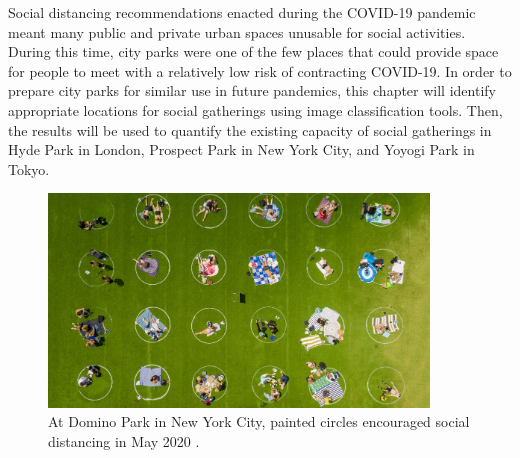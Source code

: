 \noindent Social distancing recommendations enacted during the COVID-19 pandemic meant many public and private urban spaces unusable for social activities. During this time, city parks were one of the few places that could provide space for people to meet with a relatively low risk of contracting COVID-19. In order to prepare city parks for similar use in future pandemics, this chapter will identify appropriate locations for social gatherings using image classification tools. Then, the results will be used to quantify the existing capacity of social gatherings in Hyde Park in London, Prospect Park in New York City, and Yoyogi Park in Tokyo.\\

\begin{figure}[h]
  \centering
  \includegraphics[width=0.9\textwidth]{images/gatherings/domino_park.jpeg}
  \captionsetup{width=0.9\linewidth}
  \caption[Domino Park, NYC]{At Domino Park in New York City, painted circles encouraged social distancing in May 2020 \cite{cogley_white_2020}.}
  \label{fig:domino_park}
\end{figure}

